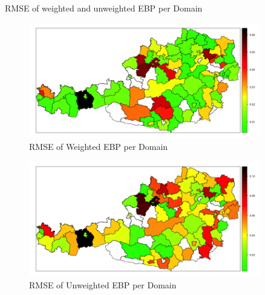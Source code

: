 \documentclass[fleqn,final]{beamer}
\newcommand{\Pheight}{\rule[-5mm]{0cm}{1cm}}
\begin{document}
\begin{frame}
\begin{columns}[t]
\end{columns}  



\begin{columns}[t]

%


\begin{column}{.3\linewidth}

\begin{block}{RMSE of weighted and unweighted EBP per Domain \Pheight}
\begin{center}
	\begin{figure}
		\includegraphics[width=0.9\textwidth]{EBPWeightedRMSE}
		\caption{RMSE of Weighted EBP per Domain}
	\end{figure}
		\begin{figure}
		\includegraphics[width=0.9\textwidth]{EBPUnweightedRMSE}
		\caption{RMSE of Unweighted EBP per Domain}
	\end{figure}
\end{center}

\end{block}

\end{column}

%


\end{columns}
\end{frame}
\end{document}
